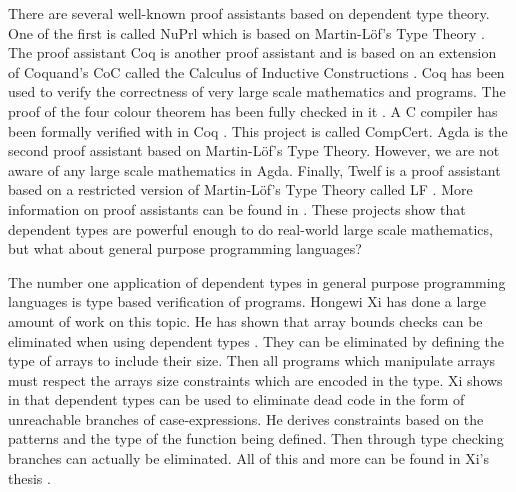 There are several well-known proof assistants based on dependent type
theory.  One of the first is called NuPrl which is based on
Martin-L\"of's Type Theory \cite{Constable:1986}. The proof assistant
Coq is another proof assistant and is based on an extension of
Coquand's CoC called the Calculus of Inductive Constructions
\cite{CoqRefMan:2008}.  Coq has been used to verify the correctness of
very large scale mathematics and programs.  The proof of the four
colour theorem has been fully checked in it \cite{Gonthier:2005}.  A C
compiler has been formally verified with in Coq
\cite{Leroy:2009,Leroy:2006}.  This project is called CompCert.  Agda
is the second proof assistant based on Martin-L\"of's Type Theory.
However, we are not aware of any large scale mathematics in Agda.
Finally, Twelf is a proof assistant based on a restricted version of
Martin-L\"of's Type Theory called LF \cite{Pfenning:1999}.  More
information on proof assistants can be found in \cite{Geuvers:2009}.
These projects show that dependent types are powerful enough to do
real-world large scale mathematics, but what about general purpose
programming languages?

The number one application of dependent types in general purpose
programming languages is type based verification of programs.  Hongewi
Xi has done a large amount of work on this topic.  He has shown that
array bounds checks can be eliminated when using dependent types
\cite{Xi:1998}.  They can be eliminated by defining the type of arrays
to include their size.  Then all programs which manipulate arrays must
respect the arrays size constraints which are encoded in the type.  Xi
shows in \cite{Xi:1999c} that dependent types can be used to eliminate
dead code in the form of unreachable branches of case-expressions.  He
derives constraints based on the patterns and the type of the function
being defined.  Then through type checking branches can actually be
eliminated.  All of this and more can be found in Xi's thesis
\cite{Xi:1999a}.  


